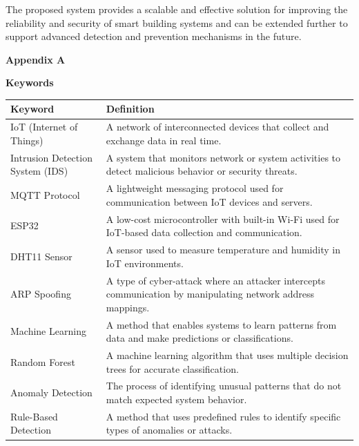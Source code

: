 The proposed system provides a scalable and effective solution for
improving the reliability and security of smart building systems and can
be extended further to support advanced detection and prevention
mechanisms in the future.

\textbf{Appendix A}

\textbf{Keywords}

{\def\LTcaptype{none} %
\begin{longtable}[]{@{}
  >{\raggedright\arraybackslash}p{}
  >{\raggedright\arraybackslash}p{}@{}}
\toprule\noalign{}
\begin{minipage}[b]{\linewidth}\centering
\textbf{Keyword}
\end{minipage} & \begin{minipage}[b]{\linewidth}\centering
\textbf{Definition}
\end{minipage} \\
\midrule\noalign{}
\endhead
\bottomrule\noalign{}
\endlastfoot
IoT (Internet of Things) & A network of interconnected devices that
collect and exchange data in real time. \\
Intrusion Detection System (IDS) & A system that monitors network or
system activities to detect malicious behavior or security threats. \\
MQTT Protocol & A lightweight messaging protocol used for communication
between IoT devices and servers. \\
ESP32 & A low-cost microcontroller with built-in Wi-Fi used for
IoT-based data collection and communication. \\
DHT11 Sensor & A sensor used to measure temperature and humidity in IoT
environments. \\
ARP Spoofing & A type of cyber-attack where an attacker intercepts
communication by manipulating network address mappings. \\
Machine Learning & A method that enables systems to learn patterns from
data and make predictions or classifications. \\
Random Forest & A machine learning algorithm that uses multiple decision
trees for accurate classification. \\
Anomaly Detection & The process of identifying unusual patterns that do
not match expected system behavior. \\
Rule-Based Detection & A method that uses predefined rules to identify
specific types of anomalies or attacks. \\

\end{longtable}}
